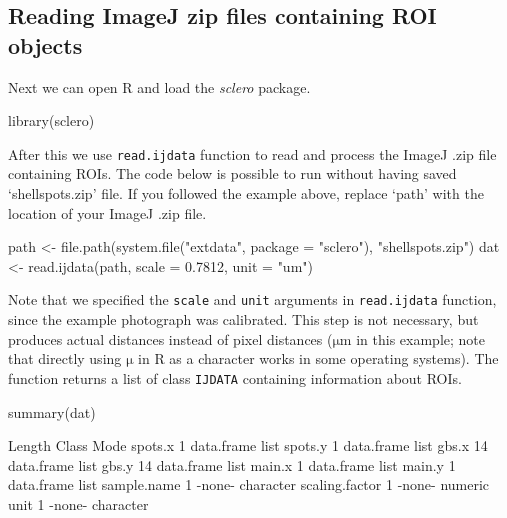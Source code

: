 \documentclass[11pt, a4paper]{article}
\newcommand{\mnote}[1]
{\marginnote{\footnotesize \raggedright \texttt{#1}}}
\begin{document}
\subsection{Reading ImageJ zip files containing ROI objects} \label{sec:read.ijdata}

Next we can open R and load the \textit{sclero} package.

\begin{Schunk}
\begin{Sinput}
 library(sclero)
\end{Sinput}
\end{Schunk}

\mnote{read.ijdata} After this we use \texttt{read.ijdata} function to read and process the ImageJ .zip file containing ROIs. The code below is possible to run without having saved `shellspots.zip' file. If you followed the example above, replace `path' with the location of your ImageJ .zip file. 

\begin{Schunk}
\begin{Sinput}
 path <- file.path(system.file("extdata", package = "sclero"), "shellspots.zip")
 dat <- read.ijdata(path, scale = 0.7812, unit = "um") 
\end{Sinput}
\end{Schunk}

Note that we specified the \texttt{scale} and \texttt{unit} arguments in \texttt{read.ijdata} function, since the example photograph was calibrated. This step is not necessary, but produces actual distances instead of pixel distances ($\mathrm{\mu m}$ in this example; note that directly using $\mathrm{\mu}$ in R as a character works in some operating systems). The function returns a list of class \texttt{IJDATA} containing information about ROIs.

\begin{Schunk}
\begin{Sinput}
 summary(dat)
\end{Sinput}
\begin{Soutput}
               Length Class      Mode     
spots.x         1     data.frame list     
spots.y         1     data.frame list     
gbs.x          14     data.frame list     
gbs.y          14     data.frame list     
main.x          1     data.frame list     
main.y          1     data.frame list     
sample.name     1     -none-     character
scaling.factor  1     -none-     numeric  
unit            1     -none-     character
\end{Soutput}
\end{Schunk}
\end{document}
